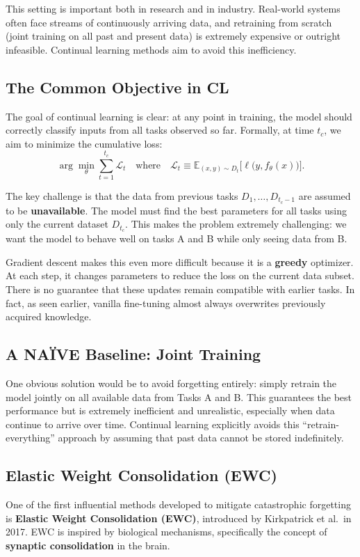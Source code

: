 This setting is important both in research and in industry. Real-world systems often face
streams of continuously arriving data, and retraining from scratch (joint training on all
past and present data) is extremely expensive or outright infeasible. Continual learning
methods aim to avoid this inefficiency.

\subsection{The Common Objective in CL}
The goal of continual learning is clear: at any point in training, the model should correctly
classify inputs from all tasks observed so far. Formally, at time $t_c$, we aim to minimize
the cumulative loss:
\[
\arg \min_{\theta} \sum_{t=1}^{t_c} \mathcal{L}_t
\quad \text{where} \quad
\mathcal{L}_t \equiv \mathbb{E}_{(x,y)\sim D_t}\bigl[\ell\bigl(y, f_\theta(x)\bigr)\bigr].
\]

The key challenge is that the data from previous tasks $D_1, \dots, D_{t_c-1}$ are assumed to
be \textbf{unavailable}. The model must find the best parameters for all tasks using only the current
dataset $D_{t_c}$. This makes the problem extremely challenging: we want the model to behave
well on tasks A and B while only seeing data from B.

Gradient descent makes this even more difficult because it is a \textbf{greedy} optimizer. At each
step, it changes parameters to reduce the loss on the current data subset. There is no
guarantee that these updates remain compatible with earlier tasks. In fact, as seen earlier,
vanilla fine-tuning almost always overwrites previously acquired knowledge.

\subsection{A NAÏVE Baseline: Joint Training}
One obvious solution would be to avoid forgetting entirely: simply retrain the model jointly on all available data from Tasks A and B.
This guarantees the best performance but is extremely inefficient and unrealistic, especially when data continue to arrive over time.
Continual learning explicitly avoids this “retrain-everything” approach by assuming that past data cannot be stored indefinitely.

\subsection{Elastic Weight Consolidation (EWC)}
One of the first influential methods developed to mitigate catastrophic forgetting is
\textbf{Elastic Weight Consolidation (EWC)}, introduced by Kirkpatrick et al.\ in 2017. EWC is
inspired by biological mechanisms, specifically the concept of \textbf{synaptic consolidation}
in the brain.

